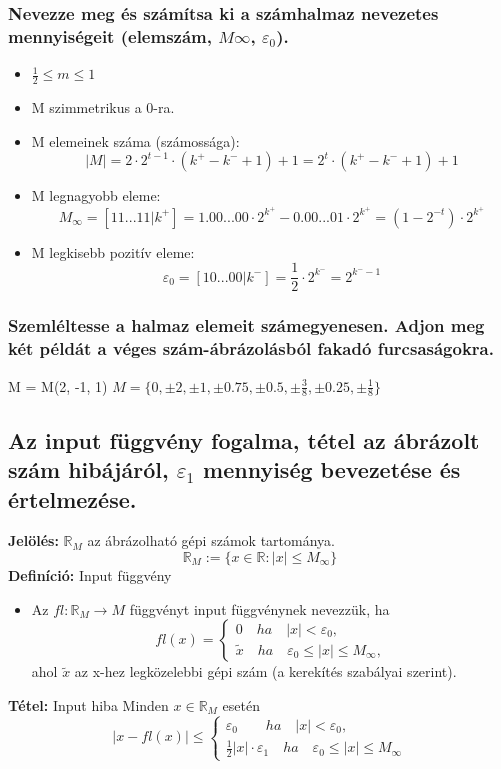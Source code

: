 \documentclass{article}
\newcommand{\tetel}{\textbf{Tétel:} \quad}
\newcommand{\jelol}{\textbf{Jelölés:} \quad}
\newcommand{\defin}{\textbf{Definíció:} \quad}
\begin{document}
            \subsubsection{Nevezze meg és számítsa ki a számhalmaz nevezetes mennyiségeit (elemszám, $M\infty$, $\varepsilon_0$).}

            \begin{itemize}
                \item $\frac{1}{2} \leq m \leq 1$
                \item M szimmetrikus a 0-ra.
                \item M elemeinek száma (számossága): \[ |M| = 2\cdot2^{t-1} \cdot (k^+-k^-+1) +1 = 2^{t} \cdot (k^+-k^-+1) +1 \]
                \item M legnagyobb eleme: \[M_\infty = [11...11|k^+] = 1.00...00\cdot2^{k^+}-0.00...01\cdot2^{k^+} = (1-2^{-t})\cdot2^{k^+}\]
                \item M legkisebb pozitív eleme: \[\varepsilon_0 = [10...00|k^-] = \frac{1}{2} \cdot 2^{k^-} = 2^{k^--1}\]
            \end{itemize}

            \subsubsection{Szemléltesse a halmaz elemeit számegyenesen. Adjon meg két példát a véges szám-ábrázolásból fakadó furcsaságokra.}
            M = M(2, -1, 1)
            $M = \{ 0, \pm 2, \pm 1, \pm 0.75, \pm 0.5, \pm \frac{3}{8}, \pm 0.25, \pm \frac{1}{8} \}$
            

        \subsection{Az input függvény fogalma, tétel az ábrázolt szám hibájáról, $\varepsilon_1$ mennyiség bevezetése és értelmezése.}
        \jelol $\mathbb{R}_M$ az ábrázolható gépi számok tartománya. \[ \mathbb{R}_M := \{ x \in \mathbb{R}: |x| \leq M_\infty \} \]
        \defin Input függvény
        \begin{itemize}
            \item Az $fl : \mathbb{R}_M \rightarrow M$ függvényt input függvénynek nevezzük, ha
            \[ 
                fl(x) = \left .
                \begin{cases} 
                    0 \quad ha \quad |x| < \varepsilon_0, \\
                    \tilde{x} \quad ha \quad \varepsilon_0 \leq |x| \leq M_\infty, 
                \end{cases} \right .
            \]
            ahol $\tilde{x}$ az x-hez legközelebbi gépi szám (a kerekítés szabályai szerint).
        \end{itemize}
        \tetel Input hiba
        Minden $x \in \mathbb{R}_M$ esetén \[ |x-fl(x)| \leq \left.
            \begin{cases}
                \varepsilon_0 \qquad ha \quad |x| < \varepsilon_0, \\
                \frac{1}{2}|x|\cdot \varepsilon_1 \quad ha \quad \varepsilon_0 \leq |x| \leq M_\infty
            \end{cases} \right.\]
\end{document}
